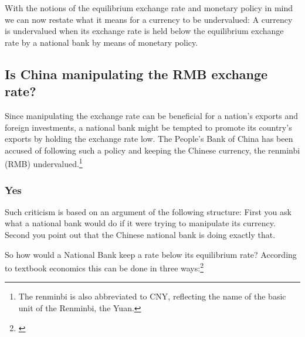 
With the notions of the equilibrium exchange rate and monetary policy in mind we can now restate what it means for a currency to be undervalued: A currency is undervalued when its exchange rate is held below the equilibrium exchange rate by a national bank by means of monetary policy.

\subsection{Is China manipulating the RMB exchange rate?}


Since manipulating the exchange rate can be beneficial for a nation’s exports and foreign investments, a national bank might be tempted to promote its country’s exports by holding the exchange rate low. The People's Bank of China has been accused of following such a policy and keeping the Chinese currency, the renminbi (RMB) undervalued.\footnote{The renminbi is also abbreviated to CNY, reflecting the name of  the basic unit of the Renminbi, the Yuan.}

\subsubsection{Yes}

Such criticism is based on an argument of the following structure: First
you ask what a national bank would do if 
it were trying to manipulate its currency. Second you point out that the Chinese national bank is doing exactly that. 

So how would a National Bank keep a rate below its equilibrium rate? According to 
textbook economics this can be done in three ways:\footnote{\cite[pp. 
514]{Krugman2008}}

